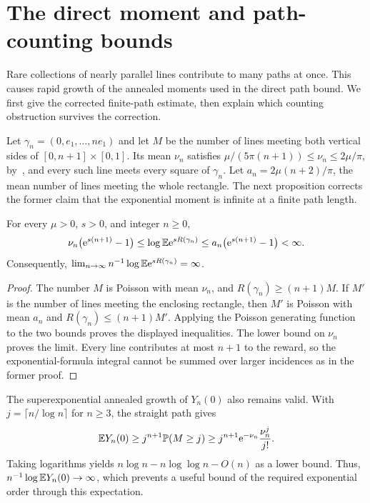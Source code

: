\documentclass[11pt,letterpaper]{article}
\begin{document}
\section{The direct moment and path-counting bounds}
\label{sec:firstmoment}

Rare collections of nearly parallel lines contribute to many paths at once. This causes rapid growth of the annealed moments used in the direct path bound. We first give the corrected finite-path estimate, then explain which counting obstruction survives the correction.

Let $\gamma_n=(0,e_1,\ldots,ne_1)$ and let $M$ be the number of lines meeting both vertical sides of $[0,n+1]\times[0,1]$. Its mean $\nu_n$ satisfies $\mu/(5\pi(n+1))\le\nu_n\le2\mu/\pi$, by~\cite[Lemma~2.1]{HJ26b}, and every such line meets every square of $\gamma_n$. Let $a_n=2\mu(n+2)/\pi$, the mean number of lines meeting the whole rectangle. The next proposition corrects the former claim that the exponential moment is infinite at a finite path length.

\begin{proposition}
\label{prop:annealed}
For every $\mu>0$, $s>0$, and integer $n\ge0$,
\[
 \nu_n\big(\mathrm{e}^{s(n+1)}-1\big)
 \le\log\mathbb E\mathrm{e}^{sR(\gamma_n)}
 \le a_n\big(\mathrm{e}^{s(n+1)}-1\big)<\infty.
\]
Consequently, $\lim_{n\to\infty}n^{-1}\log\mathbb E\mathrm{e}^{sR(\gamma_n)}=\infty$.
\end{proposition}

\begin{proof}
The number $M$ is Poisson with mean $\nu_n$, and $R(\gamma_n)\ge(n+1)M$. If $M'$ is the number of lines meeting the enclosing rectangle, then $M'$ is Poisson with mean $a_n$ and $R(\gamma_n)\le(n+1)M'$. Applying the Poisson generating function to the two bounds proves the displayed inequalities. The lower bound on $\nu_n$ proves the limit. Every line contributes at most $n+1$ to the reward, so the exponential-formula integral cannot be summed over larger incidences as in the former proof.
\end{proof}

The superexponential annealed growth of $Y_n(0)$ also remains valid. With $j=\lceil n/\log n\rceil$ for $n\ge3$, the straight path gives
\[
 \mathbb E Y_n(0)\ge j^{n+1}\mathbb P(M\ge j)
 \ge j^{n+1}\mathrm{e}^{-\nu_n}\frac{\nu_n^j}{j!}.
\]
Taking logarithms yields $n\log n-n\log\log n-O(n)$ as a lower bound. Thus, $n^{-1}\log\mathbb E Y_n(0)\to\infty$, which prevents a useful bound of the required exponential order through this expectation.
\end{document}
